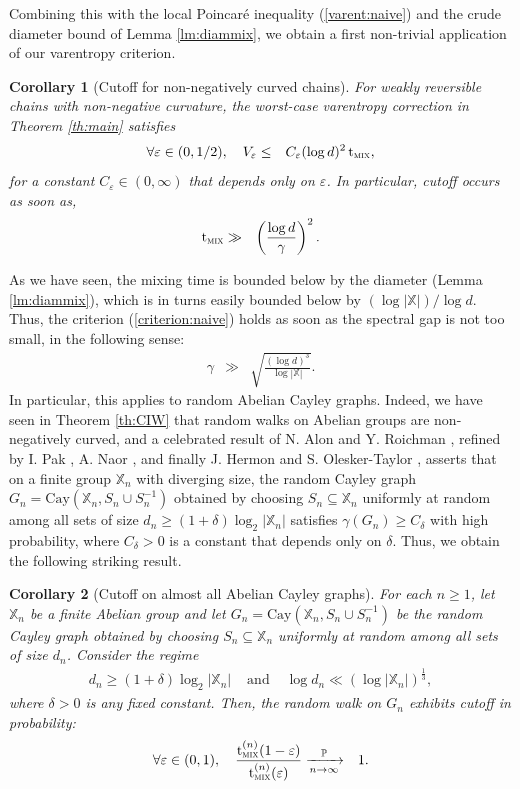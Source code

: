 \documentclass[12pt,final]{article}
\newtheorem{coro}{Corollary}[section]
\numberwithin{equation}{section}
\newcommand{\PP}{{\mathbb{P}}}
\newcommand{\dX}{\mathbb{X}}
\newcommand{\tmix}{{\rm t}_{\textsc{mix}}}
\begin{document}
Combining this with the local Poincaré inequality (\ref{varent:naive}) and the crude diameter bound of Lemma \ref{lm:diammix}, we obtain a first non-trivial application of our varentropy criterion.  
\begin{coro}[Cutoff for non-negatively curved chains]\label{coro:var}For  weakly reversible chains with non-negative curvature, the worst-case varentropy correction in Theorem \ref{th:main} satisfies
\begin{eqnarray*}
\forall \varepsilon\in(0,1/2),\quad V_{\varepsilon} & \le & C_\varepsilon (\log d)^2\,\tmix,
\end{eqnarray*}
for a constant $C_\varepsilon\in(0,\infty)$ that depends only on $\varepsilon$.   In particular, cutoff occurs as soon as,
\begin{eqnarray}
\label{criterion:naive}
\tmix& \gg & \left(\frac{\log d}{\gamma}\right)^2.
\end{eqnarray}
\end{coro}
As we have seen, the mixing time is bounded below by the diameter (Lemma \ref{lm:diammix}), which is in turns easily bounded below by $(\log |\dX|)/\log d$. Thus, the criterion (\ref{criterion:naive}) holds as soon as the spectral gap is not too small, in the following sense:
\begin{eqnarray}
\label{criterion:naive2}
\gamma & \gg & \sqrt{\frac{(\log d)^{3}}{\log |\dX|}}.
\end{eqnarray}
In particular, this applies to random Abelian Cayley graphs. Indeed, we have seen in Theorem \ref{th:CIW} that random walks on Abelian groups are non-negatively curved, and a celebrated result of N. Alon and Y. Roichman \cite{MR1262979}, refined by  I. Pak \cite{MR1729149}, A. Naor \cite{MR2942733}, and finally J. Hermon and S. Olesker-Taylor  \cite{hermon2021cutoff}, asserts that on a finite group $\dX_n$ with diverging size,  the random Cayley graph $G_n=\mathrm{Cay}(\dX_n,S_n\cup S_n^{-1})$ obtained by choosing  $S_n\subseteq\dX_n$ uniformly at random among all sets of size $d_n\ge (1+\delta)\log_2|\dX_n|$ satisfies $\gamma(G_n)\ge C_\delta$ with high probability, where $C_\delta>0$ is a constant that depends only on $\delta$. Thus, we obtain the following striking result. 
\begin{coro}[Cutoff on almost all Abelian Cayley graphs]\label{co:abelian}For each $n\ge 1$, let $\dX_n$ be a finite Abelian group and let $G_n=\mathrm{Cay}(\dX_n,S_n\cup S_n^{-1})$ be the random Cayley graph obtained by choosing  $S_n\subseteq\dX_n$ uniformly at random among all sets of size $d_n$. Consider the regime
\begin{eqnarray*}
d_n \ge  (1+\delta)\log_2 |\dX_n| & \textrm{ and } & \log d_n \ll \left(\log |\dX_n|\right)^{\frac 13},
\end{eqnarray*}
where $\delta>0$ is any fixed constant. Then, the random walk on $G_n$ exhibits cutoff in probability:
\begin{eqnarray*}
\forall \varepsilon\in(0,1),\quad \frac{\tmix^{(n)}(1-\varepsilon)}{\tmix^{(n)}(\varepsilon)} & \xrightarrow[n\to\infty]{\PP} & 1.
\end{eqnarray*}
\end{coro}
\end{document}
